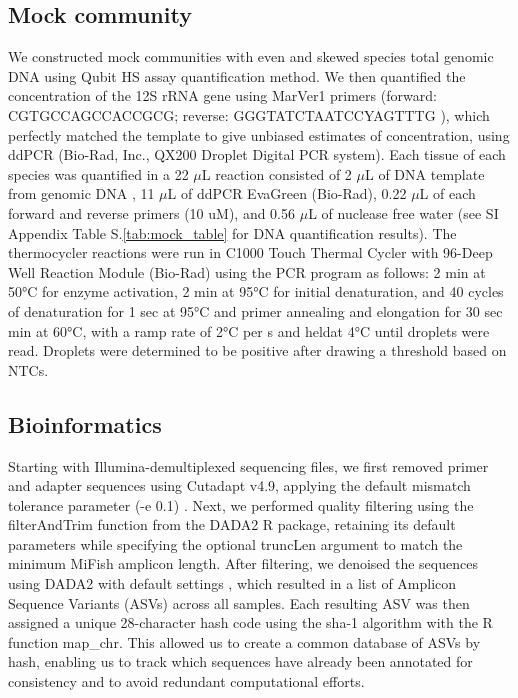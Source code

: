 \documentclass{article}
\begin{document}
\subsection*{Mock community}

We constructed mock communities with even and skewed species total genomic DNA using Qubit HS assay quantification method. We then quantified the concentration of the 12S rRNA gene using MarVer1 primers (forward: CGTGCCAGCCACCGCG; reverse: GGGTATCTAATCCYAGTTTG \cite{valsecchi2020}), which perfectly matched the template to give unbiased estimates of concentration, using ddPCR (Bio-Rad, Inc., QX200 Droplet Digital PCR system). Each tissue of each species was quantified in a 22 $\mu$L reaction consisted of 2 $\mu$L of DNA template from genomic DNA , 11 $\mu$L of ddPCR EvaGreen (Bio-Rad), 0.22 $\mu$L of each forward and reverse primers (10 uM), and 0.56 $\mu$L of nuclease free water (see SI Appendix Table S.\ref{tab:mock_table} for DNA quantification results). The thermocycler reactions were run in C1000 Touch Thermal Cycler with 96-Deep Well Reaction Module (Bio-Rad) using the PCR program as follows: 2 min at 50°C for enzyme activation, 2 min at 95°C for initial denaturation, and 40 cycles of denaturation for 1 sec at 95°C and primer annealing and elongation for 30 sec min at 60°C, with a ramp rate of 2°C per s and heldat 4°C until droplets were read. Droplets were determined to be positive after drawing a threshold based on NTCs. 

\subsection*{Bioinformatics}
Starting with Illumina-demultiplexed sequencing files, we first removed primer and adapter sequences using Cutadapt v4.9, applying the default mismatch tolerance parameter (-e 0.1) \cite{martin2011}. Next, we performed quality filtering using the filterAndTrim function from the DADA2 R package, retaining its default parameters while specifying the optional truncLen argument to match the minimum MiFish amplicon length. After filtering, we denoised the sequences using DADA2 with default settings \cite{callahan2016}, which resulted in a list of Amplicon Sequence Variants (ASVs) across all samples. Each resulting ASV was then assigned a unique 28-character hash code using the sha-1 algorithm with the R function map\_chr. This allowed us to create a common database of ASVs by hash, enabling us to track which sequences have already been annotated for consistency and to avoid redundant computational efforts.
\end{document}
